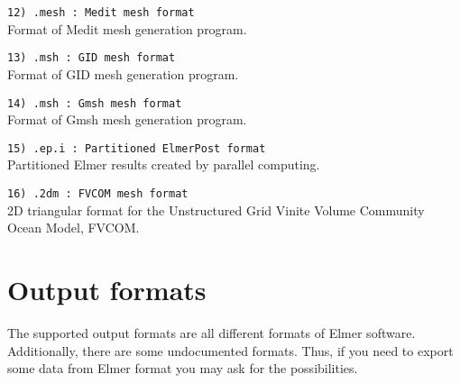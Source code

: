 \begin{description}
\item \texttt{12) .mesh     : Medit mesh format} \\
Format of Medit mesh generation program.

\item \texttt{13) .msh      : GID mesh format} \\
Format of GID mesh generation program.

\item \texttt{14) .msh      : Gmsh mesh format} \\
Format of Gmsh mesh generation program.

\item \texttt{15) .ep.i     : Partitioned ElmerPost format} \\
Partitioned Elmer results created by parallel computing. 

\item \texttt{16) .2dm      : FVCOM mesh format} \\
2D triangular format for the Unstructured Grid Vinite Volume Community Ocean Model, FVCOM.
  
\end{description}

\section{Output formats}
The supported output formats are all different 
formats of Elmer software. Additionally, there are some undocumented formats.
Thus, if you need to export some data from Elmer format you may
ask for the possibilities. 



